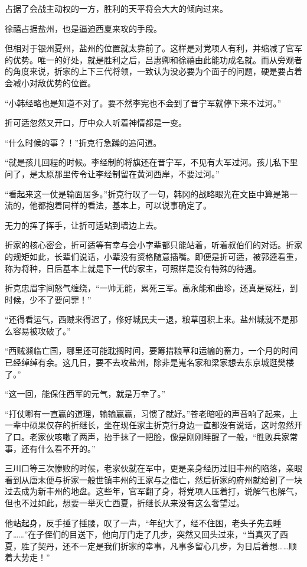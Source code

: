 占据了会战主动权的一方，胜利的天平将会大大的倾向过来。

徐禧占据盐州，也是逼迫西夏来攻的手段。

但相对于银州夏州，盐州的位置就太靠前了。这样是对党项人有利，并缩减了官军的优势。唯一的好处，就是胜利之后，吕惠卿和徐禧由此能功成名就。而从旁观者的角度来说，折家的上下三代将领，一致认为没必要为个面子的问题，硬是要占着会减小对敌优势的位置。

“小韩经略也是知道不对了。要不然李宪也不会到了晋宁军就停下来不过河。”

折可适忽然又开口，厅中众人听着神情都是一变。

“什么时候的事？！”折克行急躁的追问道。

“就是孩儿回程的时候。李经制的将旗还在晋宁军，不见有大军过河。孩儿私下里问了，是太原那里传令让李经制留在黄河西岸，不要过河。”

“看起来这一仗是输面居多。”折克行叹了一句，韩冈的战略眼光在文臣中算是第一流的，他都抱着同样的看法，基本上，可以说事确定了。

无力的挥了挥手，让折可适站到墙边上去。

折家的核心密会，折可适等有幸与会小字辈都只能站着，听着叔伯们的对话。折家的规矩如此，长辈们说话，小辈没有资格随意插嘴。即便是折可适，被郭逵看重，称为将种，日后基本上就是下一代的家主，可照样是没有特殊的待遇。

折克忠眉宇间怒气缠绕，“一帅无能，累死三军。高永能和曲珍，还真是冤枉，到时候，少不了要问罪！”

“还得看运气，西贼来得迟了，修好城民夫一退，粮草囤积上来。盐州城就不是那么容易被攻破了。”

“西贼濒临亡国，哪里还可能耽搁时间，要筹措粮草和运输的畜力，一个月的时间已经绰绰有余。这几日，要不去攻盐州，除非是嵬名家和梁家想去东京城逛樊楼了。”

“这一回，能保住西军的元气，就是万幸了。”

“打仗哪有一直赢的道理，输输赢赢，习惯了就好。”苍老暗哑的声音响了起来，上一辈中硕果仅存的折继长，坐在现任家主折克行身边一直都没有说话，这时忽然开了口。老家伙咳嗽了两声，抬手抹了一把脸，像是刚刚睡醒了一般，“胜败兵家常事，还有什么看不开的。”

三川口等三次惨败的时候，老家伙就在军中，更是亲身经历过旧丰州的陷落，亲眼看到从唐末便与折家一般世镇丰州的王家与之偕亡，然后折家的府州就给割了一块过去成为新丰州的地盘。这些年，官军翻了身，将党项人压着打，说解气也解气，但也不过如此，想要一举灭亡西夏，折继长从来没有这么奢望过。

他站起身，反手捶了捶腰，叹了一声，“年纪大了，经不住困，老头子先去睡了……”在子侄们的目送下，他向厅门走了几步，突然又回头过来，“当真灭了西夏，胜了契丹，还不一定是我们折家的幸事，凡事多留心几步，为日后着想……顺着大势走！”

